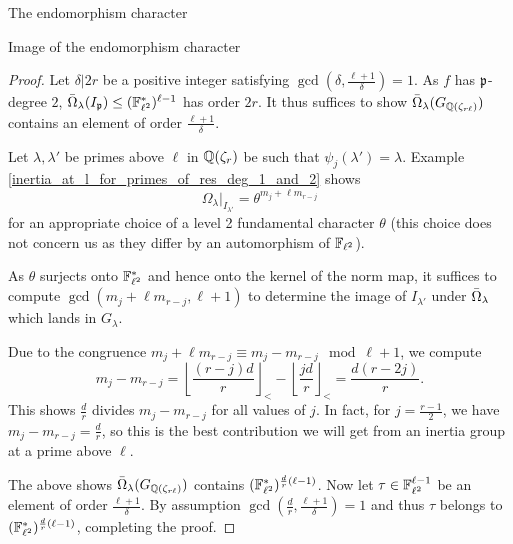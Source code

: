 \documentclass[11pt,a4paper]{article}
\newcommand{\Qr}{{\QQ(\zeta_r)}}
\newcommand{\GQrl}{G_{\QQ(\zeta_{r\ell})}}
\newcommand{\Glam}{G_{\lambda}}
\begin{document}
\begin{section}{The endomorphism character}
\begin{subsection}{Image of the endomorphism character}
\begin{proof}
 Let $\delta|2r$ be a positive integer satisfying $\gcd(\delta, \frac{\ell+1}{\delta})=1$.
 As $f$ has $\mathfrak{p}$-degree $2$, $\Bar{\Omega}_\lambda(I_{\mathfrak{p}}) \leq (\mathbb{F}^*_{\ell^2})^{\ell-1}$ has order $2r$.
It thus suffices to show $\Bar{\Omega}_\lambda(\GQrl)$ contains an element of order $\frac{\ell+1}{\delta}$.

Let $\lambda,\lambda'$ be primes above $\ell$ in $\Qr$ be such that $\psi_j(\lambda')=\lambda$. Example \ref{inertia_at_l_for_primes_of_res_deg_1_and_2} shows
\[
\Omega_\lambda|_{I_{\lambda'}} = \theta^{m_{j} + \ell m_{r-j} }
\]
for an appropriate choice of a level 2 fundamental character $\theta$ (this choice does not concern us as they differ by an automorphism of $\mathbb{F}_{\ell^2}$).

As $\theta$ surjects onto $\mathbb{F}_{\ell^2}^*$  and hence onto the kernel of the norm map, it suffices to compute  $\gcd(m_{j} + \ell m_{r-j} , \ell + 1)$ to determine the image of $I_{\lambda'}$ under $\Bar{\Omega}_\lambda$ which lands in $\Glam$.


Due to the congruence $m_{j} + \ell m_{r-j} \equiv m_{j} - m_{r-j}  \mod{ \ell + 1}$, we compute
\[m_{j} - m_{r-j} = \left\lfloor \frac{(r-j)d}{r}\right\rfloor_< - \left\lfloor \frac{jd}{r}\right\rfloor_< = \frac{d(r-2j)}{r}.
\]
This shows  $\frac{d}{r}$ divides $ m_{j} - m_{r-j}$ for all values of $j$. In fact, for $j = \frac{r-1}{2}$, we have $ m_{j} - m_{r-j} = \frac{d}{r}$, so this is the best contribution we will get from an inertia group at a prime above $\ell$.

The above shows $\Bar{\Omega}_\lambda(\GQrl)$ contains $(\mathbb{F}^*_{\ell^2})^{\frac{d}{r}(\ell-1)}$.
Now let $\tau \in \mathbb{F}_{\ell^2}^{\ell-1}$ be an element of order $\frac{\ell+1}{\delta}$.
By assumption $\gcd(\frac{d}{r},\frac{\ell+1}{\delta})=1$ and thus $\tau$ belongs to $(\mathbb{F}^*_{\ell^2})^{\frac{d}{r}(\ell-1)}$, completing the proof.

\end{proof}

\end{subsection}


\end{section}
\end{document}
